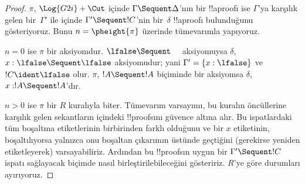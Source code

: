 \documentclass[../../../include/open-logic-section]{subfiles}
\begin{document}
\begin{proof}
  $\pi$, $\Log{G2i}+\Cut$ içinde $\Gamma \Sequent \Delta$'nın bir !!a{proof}{}ı
  ise $\Gamma$'ya karşılık gelen bir~$\Gamma'$ ile  içinde
  $\Gamma' \Sequent !C$'nin bir~$\delta$ !!a{proof}{}ı bulunduğunu gösteriyoruz.
  Bunu $n = \pheight{\pi}$ üzerinde tümevarımla yapıyoruz.

  $n = 0$ ise $\pi$ bir aksiyomdur. $\lfalse \Sequent \quad$ aksiyomuysa
  $\delta$, $x:\lfalse \Sequent \lfalse$ aksiyomudur; yani
  $\Gamma' = \{x:\lfalse\}$ ve $!C \ident \lfalse$ olur. $\pi$, $!A \Sequent
  !A$ biçiminde bir aksiyomsa $\delta$, $x: !A \Sequent !A$'dır.
  
  $n>0$ ise $\pi$ bir $R$ kuralıyla biter. Tümevarım varsayımı, bu kuralın
  öncüllerine karşılık gelen sekantların  içindeki !!{proof}s{}ını
  güvence altına alır. Bu ispatlardaki tüm boşaltma etiketlerinin birbirinden
  farklı olduğunu ve bir $x$ etiketinin, boşaltılıyorsa yalnızca onu boşaltan
  çıkarımın üstünde geçtiğini (gerekirse yeniden etiketleyerek) varsayabiliriz.
  Ardından bu !!{proof}s{}ın uygun bir $\Gamma' \Sequent !C$ ispatı sağlayacak
  biçimde nasıl birleştirilebileceğini gösteririz. $R$'ye göre durumları
  ayırıyoruz.


\end{proof}
\end{document}

